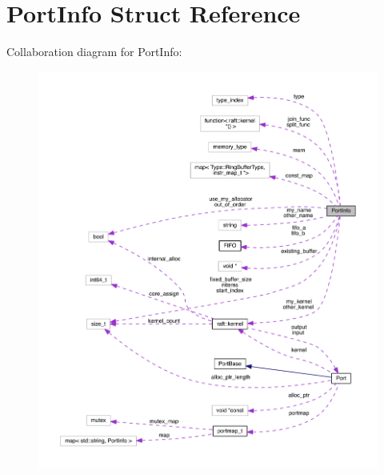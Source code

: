 \hypertarget{struct_port_info}{}\section{Port\+Info Struct Reference}
\label{struct_port_info}


Collaboration diagram for Port\+Info\+:
\nopagebreak
\begin{figure}[H]
\begin{center}
\leavevmode
\includegraphics[width=350pt]{struct_port_info__coll__graph}
\end{center}
\end{figure}
